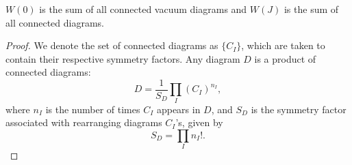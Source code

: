 \begin{claim}
  $W(0)$ is the sum of all connected vacuum diagrams and $W(J)$ is the sum of all connected diagrams.
\end{claim}
\begin{proof}
  We denote the set of connected diagrams as $\{C_I\}$, which are taken to contain their respective symmetry factors.
  Any diagram $D$ is a product of connected diagrams:
  \begin{equation}
    D = \frac{1}{S_D} \prod_I (C_I)^{n_I},
  \end{equation}
  where $n_I$ is the number of times $C_I$ appears in $D$, and  $S_D$  is the symmetry factor associated with rearranging diagrams $C_I$'s, given by
  \begin{equation}
    S_D = \prod_{I} n_I!.
  \end{equation}


\end{proof}
